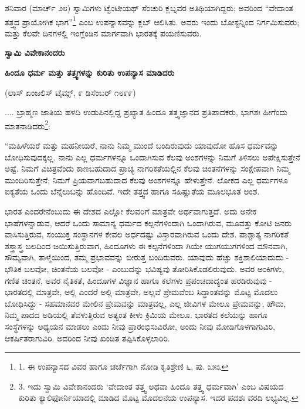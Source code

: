 ಶನಿವಾರ (ಮಾರ್ಚ್ ೨೮) ಸ್ವಾಮಿಗಳು ಟ್ವೆಂಟೀಯಥ್ ಸೆಂಚುರಿ ಕ್ಲಬ್ನವರ ಅತಿಥಿಯಾಗಿದ್ದರು; ಅವರಿಂದ “ವೇದಾಂತ ತತ್ತ್ವದ ಪ್ರಾಯೋಗಿಕ ಭಾಗ”\footnote{1. ಈ ಉಪನ್ಯಾಸದ ವಿವರ ಹಾಗೂ ಚರ್ಚೆಗಾಗಿ ನೋಡಿ ಕೃತಿಶ್ರೇಣಿ ೬, ಪು. ೩೫೩} ಎಂಬ ಉಪನ್ಯಾಸವನ್ನು ಕ್ಲಬ್ ಆಲಿಸಿತು. ಅವರು ಇಂದು ಬೋಸ್ಟನ್ನಿಂದ ನಿರ್ಗಮಿಸುವರು; ಮತ್ತು ಕೆಲವೇ ದಿನಗಳಲ್ಲಿ ಇಂಗ್ಲೆಂಡಿನ ಮಾರ್ಗವಾಗಿ ಭಾರತಕ್ಕೆ ಪಯಣಿಸುವರು.

\begin{center}
\textbf{ಸ್ವಾಮಿ ವಿವೇಕಾನಂದರು}
\end{center}

\begin{center}
\textbf{ಹಿಂದೂ ಧರ್ಮ ಮತ್ತು ತತ್ತ್ವಗಳನ್ನು ಕುರಿತು ಉಪನ್ಯಾಸ ಮಾಡಿದರು}
\end{center}

\begin{center}
(ಲಾಸ್ ಏಂಜಲಿಸ್ ಟೈಮ್ಸ್, ೯ ಡಿಸೆಂಬರ್ ೧೮೯೯)
\end{center}

.... ಬ್ರಾಹ್ಮಣ ಜಾತಿಯ ಹಳದಿ ಉಡುಪಿನಲ್ಲಿದ್ದ ಪ್ರಖ್ಯಾತ ಹಿಂದೂ ತತ್ತ್ವಜ್ಞಾನದ ಪ್ರತಿಪಾದಕರು, ಭಾಗಶಃ ಹೀಗೆಂದು ಮಾತನಾಡಿದರು\footnote{3. ಇದು ಸ್ವಾಮಿ ವಿವೇಕಾನಂದರು ‘ವೇದಾಂತ ತತ್ತ್ವ ಅಥವಾ ಹಿಂದೂ ತತ್ತ್ವ ಧರ್ಮವಾಗಿ’ ಎಂಬ ವಿಷಯದ ಕುರಿತು ಕ್ಯಾಲಿಫೋರ್ನಿಯಾದಲ್ಲಿ ಮಾಡಿದ ಮೊಟ್ಟ ಮೊದಲನೆಯ ಉಪನ್ಯಾಸ. ಇದರ ಪದಶಃ ವರದಿ ಲಭ್ಯವಿಲ್ಲ.}:

“ಮಹಿಳೆಯರೆ ಮತ್ತು ಮಹನೀಯರೆ, ನಾನು ನಿಮ್ಮ ಮುಂದೆ ಬಂದಿರುವುದು ಯಾವುದೋ ಹೊಸ ಧರ್ಮವನ್ನು ಬೋಧಿಸುವುದಕ್ಕಲ್ಲ. ನಾನು ಎಲ್ಲ ಧರ್ಮಗಳನ್ನೂ ಒಂದಾಗಿಸುವ ಕೆಲವು ಅಂಶಗಳನ್ನು ನಿಮಗೆ ತಿಳಿಸಲು ಅಪೇಕ್ಷಿಸುತ್ತೇನೆ ಅಷ್ಟೆ. ನಿಮಗೆ ವಿಚಿತ್ರವೆಂದು ಕಾಣಬಹುದಾದ ಪ್ರಾಚ್ಯ ನಾಗರಿಕತೆಯಲ್ಲಿನ ಕೆಲವು ಚಿಂತನೆಗಳನ್ನು ಸಂಕ್ಷೇಪವಾಗಿ ನಿಮ್ಮ ಮುಂದಿರಿಸುತ್ತೇನೆ; ನಿಮಗೆ ಪ್ರಿಯವಾಗಬಹುದಾದ ಕೆಲವು ಅಂಶಗಳನ್ನೂ ಹೇಳುತ್ತೇನೆ. ಲೋಕದ ಎಲ್ಲ ಧರ್ಮಗಳೂ ಐಕ್ಯತೆಯ ಒಂದು ಬೆನ್ನೆಲುಬನ್ನು ಹೊಂದಿವೆ. ಇದೇ ತತ್ತ್ವದ ಹಾಗೂ ಸಹಿಷ್ಣುತೆಯ ಮೂಲಭೂತ ಅಂಶ.

ಭಾರತ ಎಂದರೇನೆಂಬುದು ಈ ದೇಶದ ಎಲ್ಲೋ ಕೆಲವರಿಗೆ ಮಾತ್ರವೇ ಅರ್ಥವಾಗುತ್ತದೆ. ಅದು ಅನೇಕ ಭಾಷೆಗಳನ್ನಾಡುವ, ಆದರೆ ಒಂದು ಸಾಮಾನ್ಯ ಧರ್ಮದ ಕಲ್ಪನೆಗಳಿಂದಾಗಿ ಒಂದಾಗಿರುವ, ಮೂವತ್ತು ಕೋಟಿ ಜನರು ವಾಸಿಸುತ್ತಿರುವ, ಸಂಯುಕ್ತ ಸಂಸ್ಥಾನಗಳ ಕೇವಲ ಅರ್ಧದಷ್ಟು ವಿಸ್ತಾರವಾಗಿರುವ ಒಂದು ದೇಶ. ಪಾಶ್ಚಾತ್ಯ ನಾಗರಿಕತೆ ಶಸ್ತ್ರಾಸ್ತ್ರ ಬಲದಿಂದ ಜಯಿಸುತ್ತಿರುವಾಗ, ಹಿಂದೂಗಳು ಈ ಕಲ್ಪನೆಗಳಿಂದಾ ಗಿಯೇ ಯುಗಯುಗಗಳಿಂದ ಮೌನವಾಗಿ, ಸೌಮ್ಯವಾಗಿ, ತಾಳ್ಮೆಯಿಂದ, ತಮ್ಮ ಪ್ರಭಾವವನ್ನು ಬೀರುತ್ತ ಬಂದಿರುವರು. ಯಾವುದು ಹೆಚ್ಚು ಶಕ್ತಿಶಾಲಿಯಾದುದು - ಭೌತಿಕ ಬಲವೋ, ಚಿಂತನೆಯ ಬಲವೋ - ಎಂಬುದನ್ನು ಭವಿಷ್ಯವು ತೋರಿಸಿಕೊಡಲಿರುವುದು. ಅವರ ಅಂಕಿಗಳು, ಗಣಿತ ಚಿಂತನೆ, ಅವರ ನೈತಿಕತೆ, ಹಿಂದೂಗಳ ವಿಜ್ಞಾನ ಹಾಗೂ ಕಲೆಗಳು ಪ್ರಪಂಚದಾದ್ಯಂತ ಹರಡಿರುವುವು - ಭಾರತದಲ್ಲಿ ಮಾತ್ರವೇ, ಅಲ್ಲಿ ಎಂದರೆ ಅಲ್ಲಿ ಮಾತ್ರವೇ, ಅಲ್ಲವೆ ಪ್ರೇಮವೆಂಬ ಸಿದ್ಧಾಂತವನ್ನು ಮೊಟ್ಟ ಮೊದಲು ಬೋಧಿಸಿದ್ದು - ಸಹಮಾನವರ ಮೇಲಿನ ಪ್ರೇಮವನ್ನು ಮಾತ್ರವಲ್ಲ, ಎಲ್ಲ ಜೀವಿಗಳ ಮೇಲೂ ಪ್ರೇಮವನ್ನು, ಹೌದು, ನಿಮ್ಮ ಪಾದದ ಅಡಿಯಲ್ಲಿ ತೆವಳುತ್ತಿರುವ ಅತ್ಯಂತ ಕೀಳು ಕ್ರಿಮಿಯ ಮೇಲೂ. ಭಾರತದ ಕಲೆಯನ್ನು ಹಾಗೂ ಸಂಸ್ಥೆಗಳನ್ನು ಅಧ್ಯಯನ ಮಾಡಲು ಎಂದು ನೀವು ಪ್ರಾರಂಭಿಸುವಿರೋ, ಅಂದು ನೀವು ಮೋಡಿಗೊಳಗಾಗುವಿರಿ, ಆಕರ್ಷಿತರಾಗುವಿರಿ. ಅದರಿಂದ ನೀವು ಖಂಡಿತ ತಪ್ಪಿಸಿಕೊಳ್ಳಲಾರಿರಿ.

